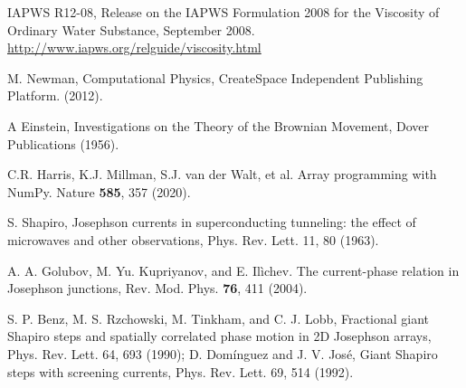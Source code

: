 \documentclass[twocolumn,preprintnumbers,amsmath,amssymb,aps,prx]{revtex4}
\begin{document}
\begin{thebibliography}{99}
      IAPWS R12-08, 
      Release on the IAPWS Formulation 2008 for the Viscosity of Ordinary Water Substance,  September 2008.
      \url{http://www.iapws.org/relguide/viscosity.html}

       M. Newman, Computational Physics, CreateSpace Independent Publishing Platform. (2012).
      

   A Einstein, Investigations on the Theory of the Brownian Movement,  Dover Publications (1956).

     C.R. Harris, K.J. Millman, S.J. van der Walt, et al. Array programming with NumPy. Nature {\bf 585}, 357 (2020). %
      




     S. Shapiro, Josephson currents in superconducting tunneling: the effect of microwaves and other observations, Phys. Rev. Lett. 11, 80 (1963).

     A. A. Golubov, M. Yu. Kupriyanov, and E. Il{\`i}chev. The current-phase relation in Josephson junctions, Rev. Mod. Phys. {\bf 76}, 411 (2004).

      S. P. Benz, M. S. Rzchowski, M. Tinkham, and C. J. Lobb, Fractional giant Shapiro steps and spatially correlated phase motion in 2D Josephson arrays, Phys. Rev. Lett. 64, 693 (1990); D. Dom{\'i}nguez and J. V. Jos{\'e}, Giant Shapiro steps with screening currents, Phys. Rev. Lett. 69, 514 (1992).


\end{thebibliography}
\end{document}
